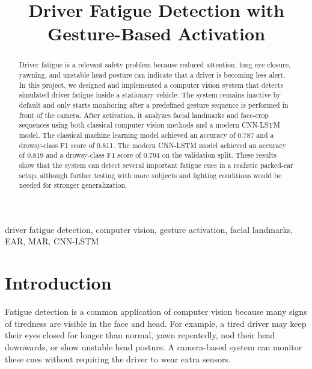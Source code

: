\documentclass[conference]{IEEEtran}
\begin{document}
\title{Driver Fatigue Detection with Gesture-Based Activation}

\author{
}

\maketitle

\begin{abstract}
Driver fatigue is a relevant safety problem because reduced attention, long eye closure, yawning, and unstable head posture can indicate that a driver is becoming less alert. In this project, we designed and implemented a computer vision system that detects simulated driver fatigue inside a stationary vehicle. The system remains inactive by default and only starts monitoring after a predefined gesture sequence is performed in front of the camera. After activation, it analyzes facial landmarks and face-crop sequences using both classical computer vision methods and a modern CNN-LSTM model. The classical machine learning model achieved an accuracy of 0.787 and a drowsy-class F1 score of 0.811. The modern CNN-LSTM model achieved an accuracy of 0.819 and a drowsy-class F1 score of 0.794 on the validation split. These results show that the system can detect several important fatigue cues in a realistic parked-car setup, although further testing with more subjects and lighting conditions would be needed for stronger generalization.
\end{abstract}

\begin{IEEEkeywords}
driver fatigue detection, computer vision, gesture activation, facial landmarks, EAR, MAR, CNN-LSTM
\end{IEEEkeywords}

\section{Introduction}

Fatigue detection is a common application of computer vision because many signs of tiredness are visible in the face and head. For example, a tired driver may keep their eyes closed for longer than normal, yawn repeatedly, nod their head downwards, or show unstable head posture. A camera-based system can monitor these cues without requiring the driver to wear extra sensors.
\end{document}
